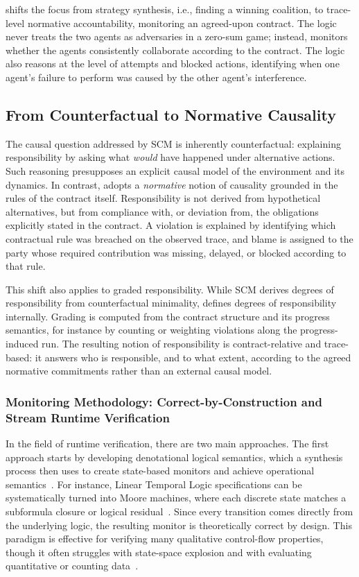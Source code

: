 \cDL shifts the focus from strategy  synthesis, i.e., finding a winning coalition, to trace-level normative accountability, monitoring an agreed-upon contract. The logic never treats the two agents as adversaries in a zero-sum game; instead, \cDL monitors whether the agents consistently collaborate according to the contract. The logic also reasons at the level of attempts and blocked actions, identifying when one agent's failure to perform was caused by the other agent's interference.
\subsection{From Counterfactual to Normative Causality}

The causal question addressed by SCM is inherently counterfactual: explaining responsibility by asking what \emph{would} have happened under alternative actions. Such reasoning presupposes an explicit causal model of the environment and its dynamics. In contrast, \cDL adopts a \emph{normative} notion of causality grounded in the rules of the contract itself. Responsibility is not derived from hypothetical alternatives, but from compliance with, or deviation from, the obligations explicitly stated in the contract. A violation is explained by identifying which contractual rule was breached on the observed trace, and blame is assigned to the party whose required contribution was missing, delayed, or blocked according to that rule.


This shift also applies to graded responsibility. While SCM derives degrees of responsibility from counterfactual minimality, \cDL defines degrees of responsibility internally. Grading is computed from the contract structure and its progress semantics, for instance by counting or weighting violations along the progress-induced run. The resulting notion of responsibility is contract-relative and trace-based: it answers who is responsible, and to what extent, according to the agreed normative commitments rather than an external causal model.

\subsubsection{Monitoring Methodology: Correct-by-Construction and Stream Runtime Verification}

In the field of runtime verification, there are two main approaches. The first approach starts by developing denotational logical semantics, which a synthesis process then uses to create state-based monitors and achieve operational semantics~\cite{Bauer2011}. For instance, Linear Temporal Logic specifications can be systematically turned into Moore machines, where each discrete state matches a subformula closure or logical residual~\cite{Bauer2011,leucker2011teaching,VardiWolper1986}. Since every transition comes directly from the underlying logic, the resulting monitor is theoretically correct by design. This paradigm is effective for verifying many qualitative control-flow properties, though it often struggles with state-space explosion and with evaluating quantitative or counting data~\cite{decker2019dissertation,henzinger2023monitoring,Bauer2011}.

